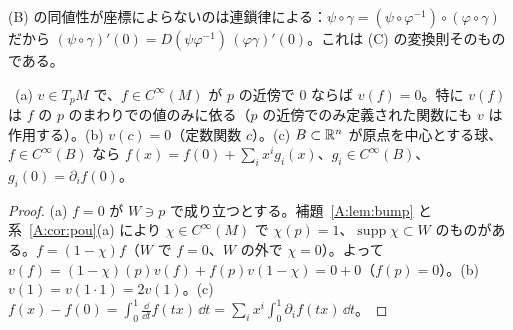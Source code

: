 (B) の同値性が座標によらないのは連鎖律による：$\psi\circ\gamma=(\psi\circ\varphi^{-1})\circ(\varphi\circ\gamma)$ だから $(\psi\circ\gamma)'(0)=D(\psi\varphi^{-1})\,(\varphi\gamma)'(0)$。これは (C) の変換則そのものである。

\begin{lem}\label{A:lem:hadamard}
\tP\ (a) $v\in T_pM$ で、$f\in C^\infty(M)$ が $p$ の近傍で $0$ ならば $v(f)=0$。特に $v(f)$ は $f$ の $p$ のまわりでの値のみに依る（$p$ の近傍でのみ定義された関数にも $v$ は作用する）。(b) $v(c)=0$（定数関数 $c$）。(c) $B\subset\mathbb R^n$ が原点を中心とする球、$f\in C^\infty(B)$ なら $f(x)=f(0)+\sum_ix^ig_i(x)$、$g_i\in C^\infty(B)$、$g_i(0)=\partial_if(0)$。
\end{lem}
\begin{proof}
(a) $f=0$ が $W\ni p$ で成り立つとする。補題~\ref{A:lem:bump} と系~\ref{A:cor:pou}(a) により $\chi\in C^\infty(M)$ で $\chi(p)=1$、$\operatorname{supp}\chi\subset W$ のものがある。$f=(1-\chi)f$（$W$ で $f=0$、$W$ の外で $\chi=0$）。よって $v(f)=(1-\chi)(p)v(f)+f(p)v(1-\chi)=0+0$（$f(p)=0$）。(b) $v(1)=v(1\cdot1)=2v(1)$。(c) $f(x)-f(0)=\int_0^1\frac{\dd}{\dd t}f(tx)\,\dd t=\sum_ix^i\int_0^1\partial_if(tx)\,\dd t$。
\end{proof}

